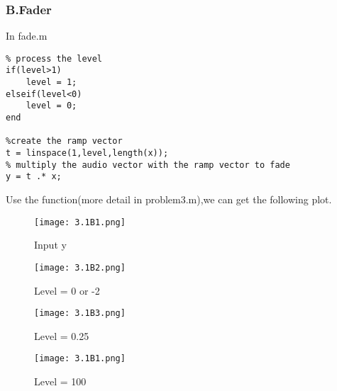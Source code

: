 \documentclass{article}
\begin{document}
\subsubsection*{B.Fader}
In fade.m
\begin{lstlisting}
% process the level
if(level>1)
    level = 1;
elseif(level<0)
    level = 0;
end

%create the ramp vector
t = linspace(1,level,length(x));
% multiply the audio vector with the ramp vector to fade
y = t .* x;
\end{lstlisting}
Use the function(more detail in problem3.m),we can get the following plot.
\begin{figure}[h]
    \begin{minipage}{0.45\textwidth}
        \centering
        \texttt{[image: 3.1B1.png]}
        \caption{Input y}
    \end{minipage}
    \begin{minipage}{0.45\textwidth}
        \centering
        \texttt{[image: 3.1B2.png]}
        \caption{Level = 0 or -2}
    \end{minipage}
    \quad

    \begin{minipage}{0.45\textwidth}
        \centering
        \texttt{[image: 3.1B3.png]}
        \caption{Level = 0.25}
    \end{minipage}
    \begin{minipage}{0.45\textwidth}
        \centering
        \texttt{[image: 3.1B1.png]}
        \caption{Level = 100}
    \end{minipage}
\end{figure}
\end{document}
